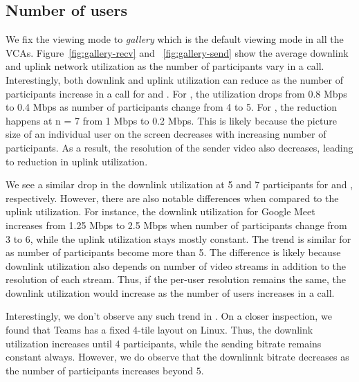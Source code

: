 \subsection{Number of users}
We fix the viewing mode to \textit{gallery} which is the default viewing mode in all the VCAs. Figure~\ref{fig:gallery-recv} and~
\ref{fig:gallery-send} show the average downlink and uplink network utilization as the number of participants vary in a call. Interestingly, both downlink and uplink utilization can reduce as the number of participants increase in a call for \meet and \zoom. For \zoom, the utilization drops from 0.8 Mbps to 0.4 Mbps as number of participants change from 4 to 5. For \meet, the reduction happens at n = 7 from 1 Mbps to  0.2 Mbps. This is likely because the picture size of an individual user on the screen decreases with increasing number of participants. As a result, the resolution of the sender video also decreases, leading to reduction in uplink utilization.


We see a similar drop in the downlink utilization at 5 and 7 participants for \zoom and \meet, respectively. However, there are also notable differences when compared to the uplink utilization. For instance, the downlink utilization for Google Meet increases from 1.25 Mbps to 2.5 Mbps when number of participants change from 3 to 6, while the uplink utilization stays mostly constant. The trend is similar for \zoom as number of participants become more than 5. The difference is likely because downlink utilization also depends on number of video streams in addition to the resolution of each stream. Thus, if the per-user resolution remains the same, the downlink utilization would increase as the number of users increases in a call.  

Interestingly, we don't observe any such trend in \teams. On a closer inspection, we found that Teams has a fixed 4-tile layout on Linux. Thus, the downlink utilization increases until 4 participants, while the sending bitrate remains constant always. However, we do observe that the downlinnk bitrate decreases as the number of participants increases beyond $5$. 
 



